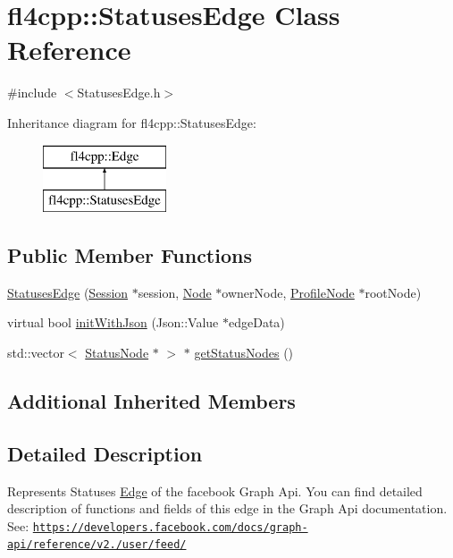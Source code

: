 \hypertarget{classfl4cpp_1_1_statuses_edge}{}\section{fl4cpp\+:\+:Statuses\+Edge Class Reference}
\label{classfl4cpp_1_1_statuses_edge}


{\ttfamily \#include $<$Statuses\+Edge.\+h$>$}

Inheritance diagram for fl4cpp\+:\+:Statuses\+Edge\+:\begin{figure}[H]
\begin{center}
\leavevmode
\includegraphics[height=2.000000cm]{classfl4cpp_1_1_statuses_edge}
\end{center}
\end{figure}
\subsection*{Public Member Functions}
\begin{DoxyCompactItemize}
\item 
\hyperlink{classfl4cpp_1_1_statuses_edge_aabbaed9cc591cfd3d3f2fb06991abf4b}{Statuses\+Edge} (\hyperlink{classfl4cpp_1_1_session}{Session} $\ast$session, \hyperlink{classfl4cpp_1_1_node}{Node} $\ast$owner\+Node, \hyperlink{classfl4cpp_1_1_profile_node}{Profile\+Node} $\ast$root\+Node)
\item 
virtual bool \hyperlink{classfl4cpp_1_1_statuses_edge_a487ef20e260d1a136800e7986e04fffa}{init\+With\+Json} (Json\+::\+Value $\ast$edge\+Data)
\item 
std\+::vector$<$ \hyperlink{classfl4cpp_1_1_status_node}{Status\+Node} $\ast$ $>$ $\ast$ \hyperlink{classfl4cpp_1_1_statuses_edge_a4e77410a8035e3cec1cb5faac0bf1213}{get\+Status\+Nodes} ()
\end{DoxyCompactItemize}
\subsection*{Additional Inherited Members}


\subsection{Detailed Description}
Represents Statuses \hyperlink{classfl4cpp_1_1_edge}{Edge} of the facebook Graph Api. You can find detailed description of functions and fields of this edge in the Graph Api documentation. See\+: \href{https://developers.facebook.com/docs/graph-api/reference/v2.0/user/feed/}{\tt https\+://developers.\+facebook.\+com/docs/graph-\/api/reference/v2./user/feed/} 

